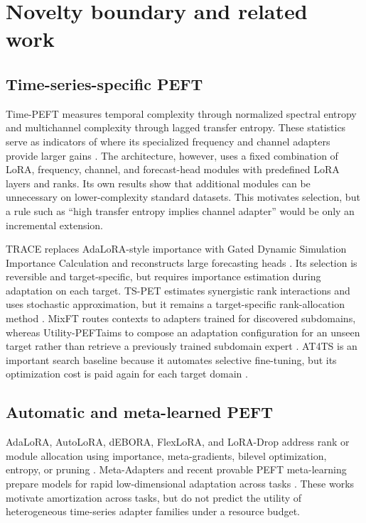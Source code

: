 \documentclass[10pt]{article}
\newcommand{\method}{Utility-PEFT}
\begin{document}
\section{Novelty boundary and related work}

\subsection{Time-series-specific PEFT}

Time-PEFT measures temporal complexity through normalized spectral entropy and multichannel complexity through lagged transfer entropy. These statistics serve as indicators of where its specialized frequency and channel adapters provide larger gains \citep{na2026timepeft}. The architecture, however, uses a fixed combination of LoRA, frequency, channel, and forecast-head modules with predefined LoRA layers and ranks. Its own results show that additional modules can be unnecessary on lower-complexity standard datasets. This motivates selection, but a rule such as ``high transfer entropy implies channel adapter'' would be only an incremental extension.

TRACE replaces AdaLoRA-style importance with Gated Dynamic Simulation Importance Calculation and reconstructs large forecasting heads \citep{li2026trace}. Its selection is reversible and target-specific, but requires importance estimation during adaptation on each target. TS-PET estimates synergistic rank interactions and uses stochastic approximation, but it remains a target-specific rank-allocation method \citep{zheng2026tspet}. MixFT routes contexts to adapters trained for discovered subdomains, whereas \method aims to compose an adaptation configuration for an unseen target rather than retrieve a previously trained subdomain expert \citep{lee2026mixft}. AT4TS is an important search baseline because it automates selective fine-tuning, but its optimization cost is paid again for each target domain \citep{tomar2025at4ts}.

\subsection{Automatic and meta-learned PEFT}

AdaLoRA, AutoLoRA, dEBORA, FlexLoRA, and LoRA-Drop address rank or module allocation using importance, meta-gradients, bilevel optimization, entropy, or pruning \citep{zhang2023adalora,zhang2024autolora,zangrando2025debora,liu2026flexlora,zhou2025loradrop}. Meta-Adapters and recent provable PEFT meta-learning prepare models for rapid low-dimensional adaptation across tasks \citep{bansal2022metaadapters,block2025provable}. These works motivate amortization across tasks, but do not predict the utility of heterogeneous time-series adapter families under a resource budget.
\end{document}
